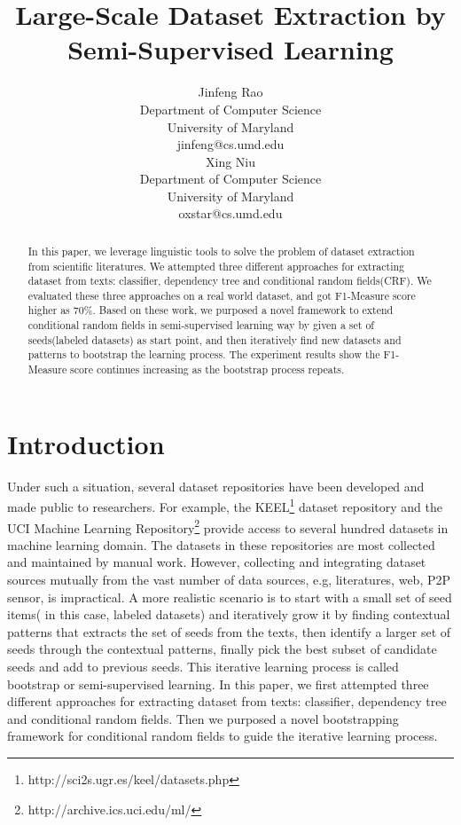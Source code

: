 \documentclass[11pt]{article}
\title{Large-Scale Dataset Extraction by Semi-Supervised Learning}
\author{Jinfeng Rao\\
  Department of Computer Science \\
  University of Maryland \\
  {jinfeng@cs.umd.edu} \\\And
  Xing Niu \\
  Department of Computer Science \\
  University of Maryland \\
  {oxstar@cs.umd.edu} \\}
\date{}
\begin{document}
\maketitle
\begin{abstract}
In this paper, we leverage linguistic tools to solve the problem of dataset extraction from scientific literatures. We attempted three different approaches for extracting dataset from texts: classifier, dependency tree and conditional random fields(CRF). We evaluated these three approaches on a real world dataset, and got F1-Measure score higher as 70\%. Based on these work, we purposed a novel framework to extend conditional random fields in semi-supervised learning way by given a set of seeds(labeled datasets) as start point, and then iteratively find new datasets and patterns to bootstrap the learning process. The experiment results show the F1-Measure score continues increasing as the bootstrap process repeats.  
\end{abstract}
\section{Introduction}

Under such a situation, several dataset repositories have been developed and made public to researchers. For example, the KEEL\footnote{http://sci2s.ugr.es/keel/datasets.php} dataset repository and the UCI Machine Learning Repository\footnote{http://archive.ics.uci.edu/ml/} provide access to several hundred datasets in machine learning domain. The datasets in these repositories are most collected and maintained by manual work. However, collecting and integrating dataset sources mutually from the vast number of data sources, e.g, literatures, web, P2P sensor, is impractical. A more realistic scenario is to start with a small set of seed items( in this case, labeled datasets) and iteratively grow it by finding contextual patterns that extracts the set of seeds from the texts, then identify a larger set of seeds through the contextual patterns, finally pick the best subset of candidate seeds and add to previous seeds. This iterative learning process is called bootstrap or semi-supervised learning. In this paper, we first attempted three different approaches for extracting dataset from texts: classifier, dependency tree and conditional random fields. Then we purposed a novel bootstrapping framework for conditional random fields to guide the iterative learning process.  \\
\end{document}
